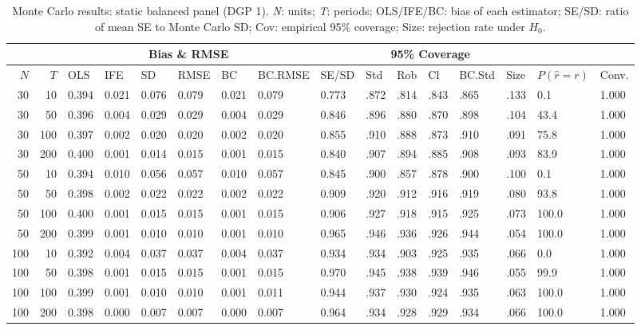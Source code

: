 \begin{table}[ht]
\centering
\caption{Monte Carlo results: static balanced panel (DGP 1). \emph{N}: units; \emph{T}: periods; OLS/IFE/BC: bias of each estimator; SE/SD: ratio of mean SE to Monte Carlo SD; Cov: empirical 95\% coverage; Size: rejection rate under $H_0$.} 
\label{tab:mc_static_bal}
\begin{tabular}{rrllllllllllllll}
  \hline
 & & \multicolumn{6}{c}{Bias \& RMSE} & & \multicolumn{4}{c}{95\% Coverage} & & & \\
\cline{3-8}\cline{10-13}
 \hline
$N$ & $T$ & OLS & IFE & SD & RMSE & BC & BC.RMSE & SE/SD & Std & Rob & Cl & BC.Std & Size & $P(\hat r=r)$ & Conv. \\ 
  \hline
30 & 10 & 0.394 & 0.021 & 0.076 & 0.079 & 0.021 & 0.079 & 0.773 & .872 & .814 & .843 & .865 & .133 & 0.1 & 1.000 \\ 
  30 & 50 & 0.396 & 0.004 & 0.029 & 0.029 & 0.004 & 0.029 & 0.846 & .896 & .880 & .870 & .898 & .104 & 43.4 & 1.000 \\ 
  30 & 100 & 0.397 & 0.002 & 0.020 & 0.020 & 0.002 & 0.020 & 0.855 & .910 & .888 & .873 & .910 & .091 & 75.8 & 1.000 \\ 
  30 & 200 & 0.400 & 0.001 & 0.014 & 0.015 & 0.001 & 0.015 & 0.840 & .907 & .894 & .885 & .908 & .093 & 83.9 & 1.000 \\ 
  50 & 10 & 0.394 & 0.010 & 0.056 & 0.057 & 0.010 & 0.057 & 0.845 & .900 & .857 & .878 & .900 & .100 & 0.1 & 1.000 \\ 
  50 & 50 & 0.398 & 0.002 & 0.022 & 0.022 & 0.002 & 0.022 & 0.909 & .920 & .912 & .916 & .919 & .080 & 93.8 & 1.000 \\ 
  50 & 100 & 0.400 & 0.001 & 0.015 & 0.015 & 0.001 & 0.015 & 0.906 & .927 & .918 & .915 & .925 & .073 & 100.0 & 1.000 \\ 
  50 & 200 & 0.399 & 0.001 & 0.010 & 0.010 & 0.001 & 0.010 & 0.965 & .946 & .936 & .926 & .944 & .054 & 100.0 & 1.000 \\ 
  100 & 10 & 0.392 & 0.004 & 0.037 & 0.037 & 0.004 & 0.037 & 0.934 & .934 & .903 & .925 & .935 & .066 & 0.0 & 1.000 \\ 
  100 & 50 & 0.398 & 0.001 & 0.015 & 0.015 & 0.001 & 0.015 & 0.970 & .945 & .938 & .939 & .946 & .055 & 99.9 & 1.000 \\ 
  100 & 100 & 0.399 & 0.001 & 0.010 & 0.010 & 0.001 & 0.011 & 0.944 & .937 & .930 & .924 & .935 & .063 & 100.0 & 1.000 \\ 
  100 & 200 & 0.398 & 0.000 & 0.007 & 0.007 & 0.000 & 0.007 & 0.964 & .934 & .928 & .929 & .934 & .066 & 100.0 & 1.000 \\ 

\end{tabular}
\end{table}
